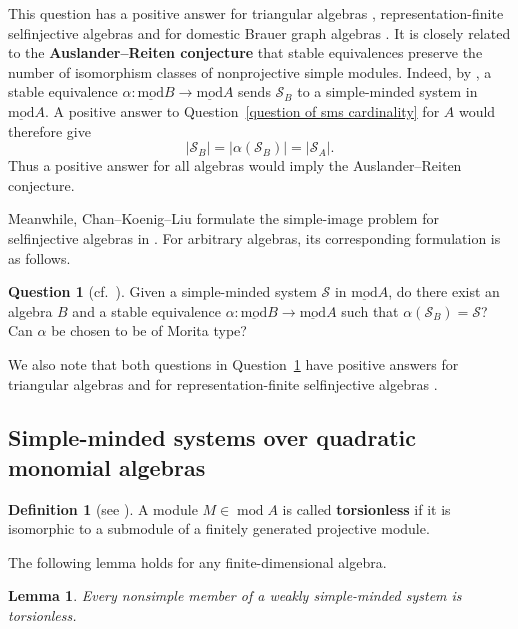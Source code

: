 \documentclass[11pt]{article}
\renewcommand{\mod}{\operatorname{mod}}
\newcommand{\smod}{\operatorname{\underline{mod}}}
\newtheorem{lemma}[theorem]{Lemma}
\theoremstyle{definition}
\newtheorem{definition}[theorem]{Definition}
\newtheorem{question}[theorem]{Question}
\begin{document}
		This question has a  positive answer for triangular algebras \cite{KL12}, representation-finite selfinjective algebras \cite{CKL15} and for domestic Brauer graph algebras \cite{Zha25,Zha26BGAII}. It is closely related to the \textbf{Auslander--Reiten conjecture} that stable equivalences preserve the number of isomorphism classes of nonprojective simple modules.
		Indeed, by \cite[Theorem~3.2]{KL12}, a stable equivalence $\alpha:\smod B\longrightarrow\smod A$ sends $\mathcal S_B$ to a simple-minded system in $\smod A$. A positive answer to Question~\ref{question of sms cardinality} for $A$ would therefore give
		\[
			|\mathcal S_B|
			=|\alpha(\mathcal S_B)|
			=|\mathcal S_A|.
		\]
		Thus a positive answer for all algebras would imply the Auslander--Reiten conjecture.

		Meanwhile, Chan--Koenig--Liu formulate the simple-image problem for selfinjective algebras in \cite{CKL15}. For arbitrary algebras, its corresponding formulation is as follows.

		\begin{question}[{cf.~\cite[Problem~2.2]{CKL15}}]\label{question of sms simple images}
			Given a simple-minded system $\mathcal S$ in $\smod A$, do there exist an algebra $B$ and a stable equivalence $\alpha:\smod B\longrightarrow\smod A$ such that $\alpha(\mathcal S_B)=\mathcal S$? Can $\alpha$ be chosen to be of Morita type?
		\end{question}

		We also note that both questions in Question~\ref{question of sms simple images} have positive answers for triangular algebras \cite{KL12} and for representation-finite selfinjective algebras \cite{CKL15}.



	\subsection{Simple-minded systems over quadratic monomial algebras}

		\begin{definition}[{see \cite[Introduction]{Rin12}}]
			A module $M\in\mod A$ is called \textbf{torsionless} if it is isomorphic to a submodule of a finitely generated projective module.
		\end{definition}

		The following lemma holds for any finite-dimensional algebra.

		\begin{lemma}\label{lemma of weak sms torsionless}
			Every nonsimple member of a weakly simple-minded system is torsionless.
		\end{lemma}
\end{document}

